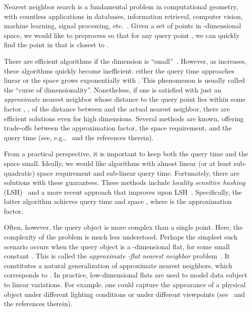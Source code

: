 \documentclass[a4paper,11pt]{paper}
\begin{document}
Nearest neighbor search is a fundamental
problem in computational geometry, with
countless applications in databases,
information retrieval, computer vision,
machine learning, signal processing,
etc.~\cite{Indyk04}.  Given a set
 of  points in
-dimensional
space, we would like to preprocess 
so that for any query point ,
we can quickly find the point in 
that is closest to .

There are efficient
algorithms if the dimension  is
``small''~\cite{Clarkson88,Meiser93}.
However, as  increases, these
algorithms quickly become inefficient:
either the query time approaches linear
or the space grows exponentially with
. This phenomenon is usually called
the ``curse of dimensionality''.
Nonetheless, if one is satisfied with
just an \emph{approximate} nearest
neighbor whose distance to the query
point  lies within some factor
, , of the distance between
 and the actual nearest neighbor,
there are efficient solutions even for high
dimensions. Several methods are known,
offering trade-offs between the
approximation factor, the space
requirement, and the query time (see,
e.g.,~\cite{Andoni09,AndoniInNgRa14}
and the references therein).

From a practical perspective, it is
important to keep both the query time
and the space small. Ideally, we would
like algorithms with almost linear
(or at least sub-quadratic) space
requirement and sub-linear query time.
Fortunately, there are solutions with
these guarantees. These methods
include \emph{locality sensitive hashing}
(LSH)~\cite{IndykMo98,KushilevitzOsRa98}
and a more recent approach that improves
upon LSH~\cite{AndoniInNgRa14}. Specifically,
the latter algorithm achieves query time
 and space
, where
 is the approximation factor.

Often, however, the query object is more
complex than a single point. Here,
the complexity of the problem is much less
understood. Perhaps the simplest such
scenario occurs when the query object is
a -dimensional flat, for some small
constant . This is called the
\emph{approximate -flat nearest neighbor}
problem~\cite{AndoniInKrNg09}. It constitutes
a natural generalization of approximate
nearest neighbors, which corresponds
to .  In practice, low-dimensional
flats are used to model data subject
to linear variations.  For example, one
could capture the appearance of a
physical object under different lighting
conditions or under different
viewpoints (see~\cite{BasriHaZe07} and the references therein).
\end{document}
